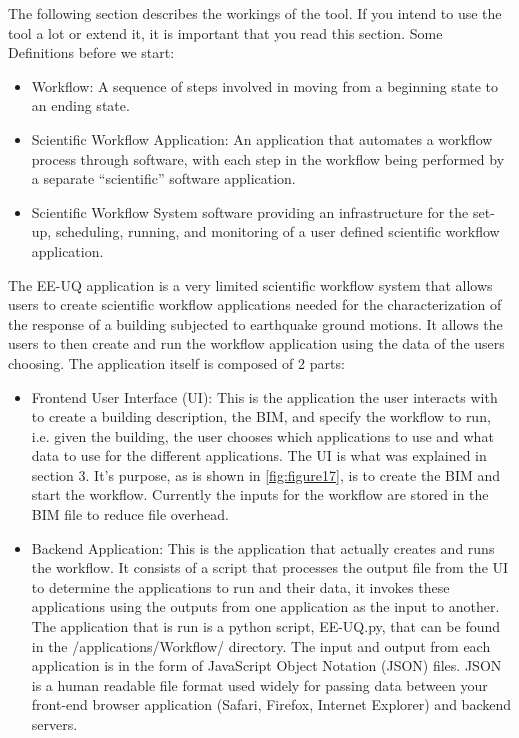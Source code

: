 The following section describes the workings of the tool. If you intend to use the tool a lot or extend it, 
it is important that you read this section. Some Definitions before we start:
\begin{itemize}
\item Workflow: A sequence of steps involved in moving from a beginning state to an ending state.
\item Scientific Workflow Application: An application that automates a workflow process through software, with each step in the 
workflow being performed by a separate “scientific” software application.
\item Scientific Workflow System software providing an infrastructure for the set-up, scheduling, running, and monitoring of a 
user defined scientific workflow application. 
\end{itemize}

The EE-UQ application is a very limited scientific workflow system that allows users to create scientific workflow applications needed for the characterization of the response of a building subjected to earthquake ground motions. It allows the users to then create and run the workflow application using the data of the users choosing. The application itself is composed of 2 parts:

\begin{itemize}
\item	Frontend User Interface (UI): This is the application the user interacts with to create a building description, the BIM, and specify  the workflow to run, i.e. given the building, the user chooses which applications to use and what data to use for the different applications. 
The UI is what was explained in section 3. It’s purpose, as is shown in \autoref{fig:figure17}, is to create the BIM and start the workflow. 
Currently the inputs for the workflow are stored in the BIM file to reduce file overhead.
\item	Backend Application: This is the application that actually creates and runs the workflow. It consists of a script that processes the output file from the UI to determine the applications to run and their data, it invokes these applications using the outputs from one application as the input to another. The application that is run is a python script, EE-UQ.py, that can be found in the /applications/Workflow/ directory. 
The input and output from each application is in the form of JavaScript Object Notation (JSON) files. JSON is a human readable file format used  widely for passing data between your front-end browser application (Safari, Firefox, Internet Explorer) and backend servers.
\end{itemize}




